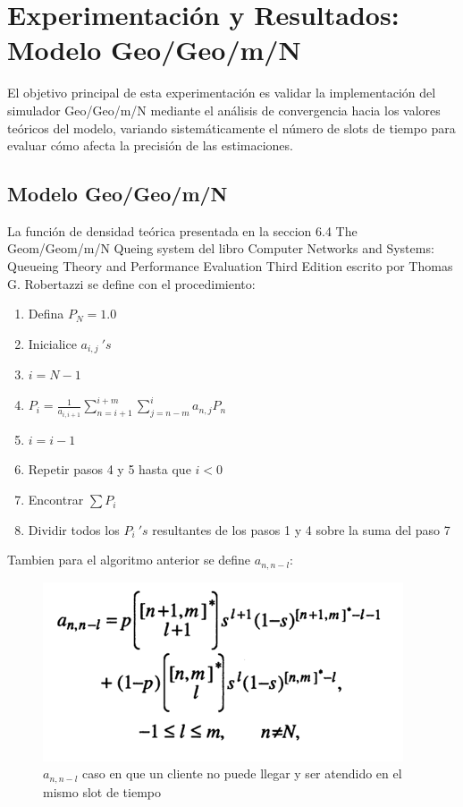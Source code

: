 \documentclass{article}
\begin{document}


\section{Experimentación y Resultados: Modelo Geo/Geo/m/N}\label{sec:exp}
El objetivo principal de esta experimentación es validar la implementación del simulador Geo/Geo/m/N mediante el análisis de convergencia hacia los valores teóricos del modelo, variando sistemáticamente el número de slots de tiempo para evaluar cómo afecta la precisión de las estimaciones.
\subsection{Modelo Geo/Geo/m/N}

La función de densidad teórica presentada en la seccion 6.4 The Geom/Geom/m/N Queing system del libro Computer Networks and Systems: Queueing Theory and Performance Evaluation Third Edition escrito por Thomas G. Robertazzi se define con el procedimiento:

\begin{enumerate}
    \item Defina $P_N = 1.0$
    \item Inicialice $a_{i,j}\ 's$
    \item $i = N-1$
    \item $	P_i=\frac{1}{a_{i,i+1}}\sum_{n=i+1}^{i+m}\sum_{j=n-m}^{i}{a_{n,j}P_n}$
    \item $i=i-1$
    \item Repetir pasos 4 y 5 hasta que $i<0$
    \item Encontrar $\sum {P_i}$
    \item Dividir todos los $P_i\ 's$ resultantes de los pasos 1 y 4 sobre la suma del paso 7
\end{enumerate}

Tambien para el algoritmo anterior se define $a_{n,n-l}$:
\begin{figure}[H]
    \centering
    \includegraphics[width=0.5\linewidth]{images/imageGeoGeoMCalc1.png}
    \caption{$a_{n,n-l}$ caso en que un cliente no puede llegar y ser atendido en el mismo slot de tiempo}
    \label{fig:enter-label}
\end{figure}
\end{document}
